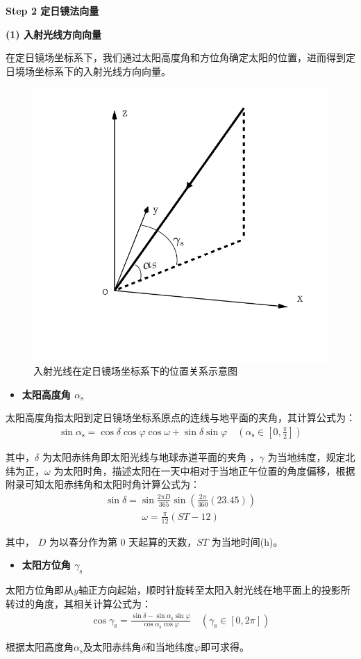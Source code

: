 \documentclass[../main.tex]{subfiles}
\begin{document}
\noindent \textbf{Step 2 定日镜法向量}
\par \textbf{(1) 入射光线方向向量}
\par 在定日镜场坐标系下，我们通过太阳高度角和方位角确定太阳的位置，进而得到定日境场坐标系下的入射光线方向向量。
\begin{figure}[H]
\centering
\includegraphics[width=.6\textwidth]{3}
\caption{入射光线在定日镜场坐标系下的位置关系示意图}
\label{1.2}
\end{figure} 
\begin{itemize}
\item \textbf{太阳高度角 $\alpha_{\text{s}}$}
\end{itemize}
\par 太阳高度角指太阳到定日镜场坐标系原点的连线与地平面的夹角，其计算公式为：
\begin{align}    \label{1.4}
\sin \alpha _{\text{s}}=\cos \delta \cos \varphi \cos \omega +\sin \delta \sin \varphi \quad \left( \alpha _{\text{s}}\in \left[ 0,\frac{\pi}{2} \right] \right) 
\end{align}
\par 其中，$\delta$ 为太阳赤纬角即太阳光线与地球赤道平面的夹角 ，$\gamma$ 为当地纬度，规定北纬为正，$\omega$ 为太阳时角，描述太阳在一天中相对于当地正午位置的角度偏移，根据附录可知太阳赤纬角和太阳时角计算公式为：
\begin{align}    \label{1.5}
\sin\delta = \sin\frac{2\pi D}{365} \sin\left(\frac{2\pi}{360}(23.45)\right)
\end{align}
\begin{align}    \label{1.6}
\omega = \frac{\pi}{12}(ST - 12)
\end{align}
\par 其中， $D$ 为以春分作为第 0 天起算的天数，$ST$ 为当地时间(h)。
\begin{itemize}
\item \textbf{太阳方位角 $ \gamma _{\text{s}}$}
\end{itemize}
\par 太阳方位角即从$y$轴正方向起始，顺时针旋转至太阳入射光线在地平面上的投影所转过的角度，其相关计算公式为：
\begin{align}    \label{1.7}
\cos \gamma _{\text{s}}=\frac{\sin \delta -\sin \alpha _{\text{s}}\sin \varphi}{\cos \alpha _{\text{s}}\cos \varphi}\quad \left( \gamma _{\text{s}}\in \left[ 0,2\pi \right] \right) 
\end{align}
\par 根据太阳高度角$\alpha_{\text{s}}$及太阳赤纬角$\delta$和当地纬度$\varphi$即可求得。
\end{document}
